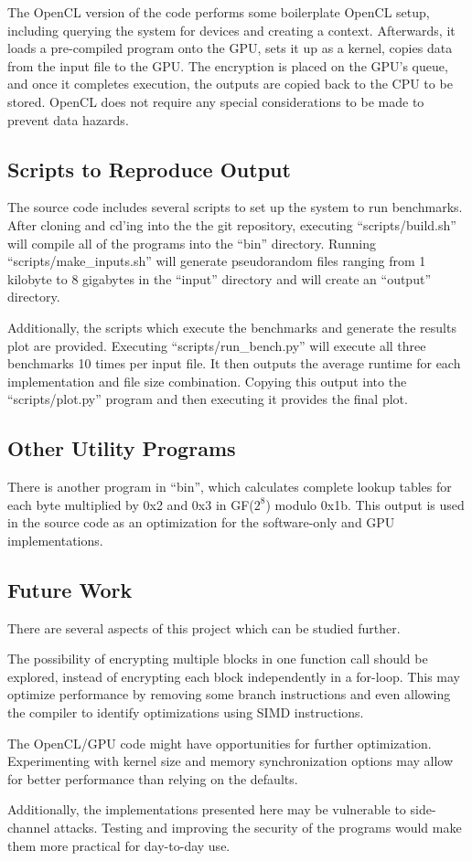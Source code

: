 \documentclass[a4paper,10pt]{article}
\begin{document}
The OpenCL version of the code performs some boilerplate OpenCL setup, including querying the system for devices and creating a context.  Afterwards, it loads a pre-compiled program onto the GPU, sets it up as a kernel, copies data from the input file to the GPU.  The encryption is placed on the GPU's queue, and once it completes execution, the outputs are copied back to the CPU to be stored.  OpenCL does not require any special considerations to be made to prevent data hazards.

\subsection{Scripts to Reproduce Output}

The source code includes several scripts to set up the system to run benchmarks.  After cloning and cd'ing into the the git repository, executing ``scripts/build.sh'' will compile all of the programs into the ``bin'' directory. Running ``scripts/make\_inputs.sh'' will generate pseudorandom files ranging from 1 kilobyte to 8 gigabytes in the ``input'' directory and will create an ``output'' directory.

Additionally, the scripts which execute the benchmarks and generate the results plot are provided.  Executing ``scripts/run\_bench.py'' will execute all three benchmarks 10 times per input file.  It then outputs the average runtime for each implementation and file size combination.  Copying this output into the ``scripts/plot.py'' program and then executing it provides the final plot.

\subsection{Other Utility Programs}

There is another program in ``bin'', which calculates complete lookup tables for each byte multiplied by 0x2 and 0x3 in GF($2^8$) modulo 0x1b.  This output is used in the source code as an optimization for the software-only and GPU implementations.

\subsection{Future Work}

There are several aspects of this project which can be studied further.

The possibility of encrypting multiple blocks in one function call should be explored, instead of encrypting each block independently in a for-loop. This may optimize performance by removing some branch instructions and even allowing the compiler to identify optimizations using SIMD instructions.

The OpenCL/GPU code might have opportunities for further optimization.  Experimenting with kernel size and memory synchronization options may allow for better performance than relying on the defaults.

Additionally, the implementations presented here may be vulnerable to side-channel attacks.  Testing and improving the security of the programs would make them more practical for day-to-day use.



\end{document}
